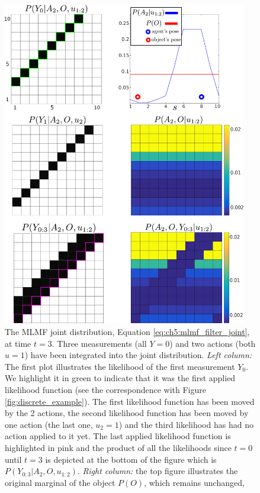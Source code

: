 \begin{figure}
 \centering
 \includegraphics[width=0.95\textwidth]{./ch5-MLMF/Figures/explenation/example_marginal.pdf}
 \caption{The MLMF joint distribution, Equation \ref{eq:ch5:mlmf_filter_joint}, at time $t=3$.
 Three measurements (all $Y=0$) and two actions (both $u=1$) have been integrated into the joint distribution. \textit{Left column:} The first plot
 illustrates the likelihood of the first measurement $Y_0$. We highlight it in green to indicate that it was the first applied likelihood 
 function (see the correspondence with Figure \ref{fig:discrete_example}). The first likelihood function has been moved by the 2 actions, the 
 second likelihood function has been moved by one action (the last one, $u_2=1$) and the third likelihood has had no action applied to it 
 yet. The last applied likelihood function is highlighted in pink and the product of all the likelihoods since $t=0$ until $t=3$ is depicted at the 
 bottom of the figure which is $P(Y_{0:3}|A_2,O,u_{1:2})$. \textit{Right column:} the top figure illustrates the original marginal of the object $P(O)$, which remains unchanged, 
}
\end{figure}
